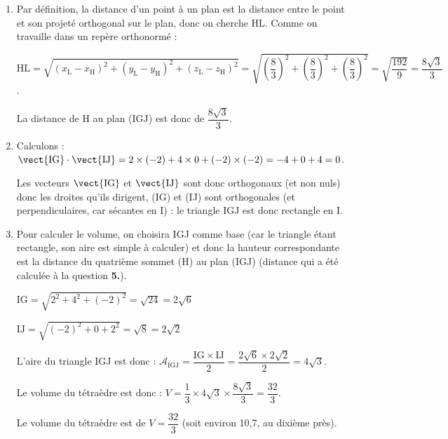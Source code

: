 \begin{enumerate}
L est donc $M_{\frac{-8}{3}}$ sur la droite $d$ : il a donc comme coordonnées L$\left(-\dfrac{-8}{3}~;~4 + \dfrac{-8}{3}~;~8 + \dfrac{-8}{3} \right)$.

Cela confirme L$\left(\dfrac{8}{3}~;~\dfrac{12-8}{3} ~;~\dfrac{24-8}{3}\right) $

Autrement dit, le point L est bien le point de coordonnées $ \left(\dfrac{8}{3}~;~\dfrac{4}{3}~;~\dfrac{16}{3}\right)  $.

\item Par définition, la distance d'un point à un plan est la distance entre le point et son projeté orthogonal sur le plan, donc on cherche HL. Comme on travaille dans un repère orthonormé :

$\mathrm{HL} = \sqrt{(x_\mathrm{L} - x_\mathrm{H})^2+(y_\mathrm{L} - y_\mathrm{H})^2+(z_\mathrm{L} - z_\mathrm{H})^2} = \sqrt{\left(\dfrac{8}{3}\right)^2+\left(\dfrac{8}{3}\right)^2+\left(\dfrac{8}{3}\right)^2 } = \sqrt{\dfrac{192}{9}}=\dfrac{8\sqrt{3}}{3}$.

La distance de H au plan (IGJ) est donc de $ \dfrac{8\sqrt{3}}{3}$.

\item Calculons : $\vect{\mathrm{IG}}\cdot\vect{\mathrm{IJ}} = 2\times (-2) + 4\times 0 +(-2)\times (-2) = -4 + 0 +4= 0$.

Les vecteurs $\vect{\mathrm{IG}}$ et $\vect{\mathrm{IJ}}$ sont donc orthogonaux (et non nuls) donc les droites qu'ils dirigent, (IG) et (IJ) sont orthogonales (et perpendiculaires, car sécantes en I) : le triangle IGJ est donc rectangle en I.

\item Pour calculer le volume, on choisira IGJ comme base (car le triangle étant rectangle, son aire est simple à calculer) et donc la hauteur correspondante est la distance du quatrième sommet (H) au plan (IGJ) (distance qui a été calculée à la question \textbf{5.}).

$\mathrm{IG} = \sqrt{2^2 + 4^2 + (-2)^2} = \sqrt{24}=2\sqrt{6}$

$ \mathrm{IJ} = \sqrt{(-2)^2 + 0 + 2^2} = \sqrt{8} = 2\sqrt{2}$

L'aire du triangle IGJ est donc : $\mathcal{A}_{\mathrm{IGJ}} = \dfrac{\mathrm{IG}\times \mathrm{IJ}}{2} = \dfrac{2\sqrt{6}\times 2\sqrt{2}}{2} = 4\sqrt{3}$.

Le volume du tétraèdre est donc : $V = \dfrac{1}{3} \times 4\sqrt{3} \times \dfrac{8\sqrt{3}}{3} = \dfrac{32}{3}$.

Le volume du tétraèdre est de $V = \dfrac{32}{3}$ (soit environ 10,7, au dixième près).
\end{enumerate}

\bigskip
